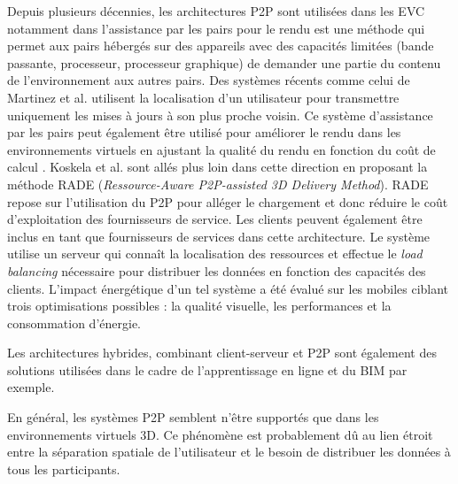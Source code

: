 Depuis plusieurs décennies, les architectures \gls{P2P} sont utilisées dans les 
\gls{EVC} notamment dans l'assistance par les pairs pour le rendu est une 
méthode qui permet aux pairs hébergés sur des appareils avec des capacités 
limitées (bande passante, processeur, processeur graphique) de demander une 
partie du contenu de l'environnement aux autres pairs.
Des systèmes récents comme celui de Martinez et al. \cite{Martinez2009} 
utilisent la 
localisation d'un utilisateur pour transmettre uniquement les mises à jours à son 
plus 
proche voisin. 
Ce système d'assistance par les pairs peut également être utilisé pour améliorer le 
rendu dans les environnements virtuels en ajustant la qualité du rendu en fonction 
du coût de calcul \cite{Zhu2011}.  
Koskela et al. \cite{Koskela2014} sont allés plus loin dans cette direction en 
proposant la méthode RADE (\textit{Ressource-Aware P2P-assisted 3D Delivery 
	Method}). RADE repose sur l'utilisation du \gls{P2P} pour alléger le chargement 
	et 
donc réduire le coût d'exploitation des fournisseurs de service. Les 
clients peuvent également être inclus en tant que fournisseurs de services dans 
cette architecture. 
Le système utilise un serveur qui connaît la localisation des ressources et 
effectue le \textit{load balancing} nécessaire pour distribuer les données en 
fonction des capacités des clients. L'impact énergétique d'un tel système a été 
évalué sur les mobiles ciblant trois optimisations possibles : la qualité visuelle, les 
performances et la consommation d'énergie. 

Les architectures hybrides, combinant client-serveur et \gls{P2P} sont également 
des solutions utilisées dans le cadre de l'apprentissage en ligne 
\cite{Ekadiyanto2012} et du BIM \cite{Chen2014} par exemple. 

En général, les systèmes \gls{P2P} semblent n'être supportés que dans les 
environnements virtuels 3D. Ce phénomène est probablement dû au lien étroit 
entre la séparation spatiale de l'utilisateur et le besoin de distribuer les données à 
tous les participants.
%
%

